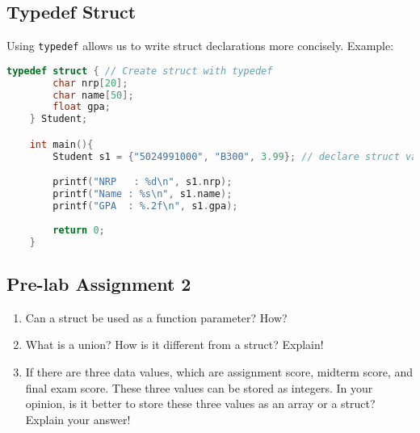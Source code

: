 \subsection{Typedef Struct}

Using \texttt{typedef} allows us to write struct declarations more concisely.
Example:
\begin{lstlisting}[language=c]
	typedef struct { // Create struct with typedef
		char nrp[20];
		char name[50];
		float gpa;
	} Student;

	int main(){
		Student s1 = {"5024991000", "B300", 3.99}; // declare struct variable without writing struct Student

		printf("NRP   : %d\n", s1.nrp);
		printf("Name : %s\n", s1.name);
		printf("GPA  : %.2f\n", s1.gpa);
		
		return 0;
	}
\end{lstlisting}

\subsection*{Pre-lab Assignment 2}
\begin{enumerate}
    \item Can a struct be used as a function parameter? How?
    \item What is a union? How is it different from a struct? Explain!
    \item If there are three data values, which are assignment score, midterm score, and final exam score.
    These three values can be stored as integers.
    In your opinion, is it better to store these three values as an array or a struct? Explain your answer!
\end{enumerate}
